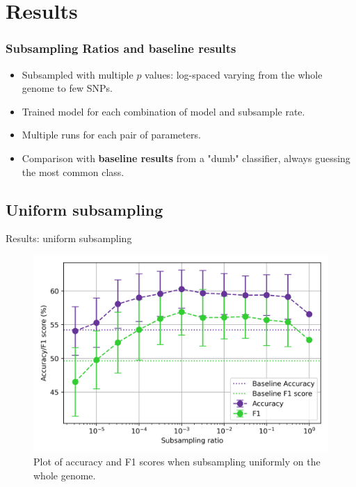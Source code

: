 \documentclass[aspectratio=169]{beamer}
\begin{document}
\section{Results}
\begin{frame}
\frametitle{Subsampling Ratios and baseline results}
\begin{itemize}
    \item Subsampled with multiple $p$ values: log-spaced varying from the whole genome to few SNPs.
  \item Trained model for each combination of model and subsample rate.
  \item Multiple runs for each pair of parameters.
  \item Comparison with \textbf{baseline results} from a "dumb" classifier, always guessing the most common class.
\end{itemize}
\end{frame}

\subsection{Uniform subsampling}
\begin{frame}{Results: uniform subsampling}
\begin{figure}[H]
    \centering
    \includegraphics[height=0.5\textwidth]{../figures/subsample_plot.png}
    \caption{Plot of accuracy and F1 scores when subsampling uniformly on the whole genome.}
    \label{fig:res1a}
\end{figure}
\end{frame}
\end{document}
